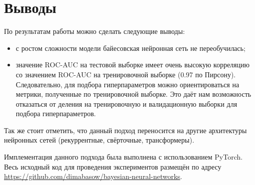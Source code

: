 \documentclass{article}
\numberwithin{equation}{section}
\begin{document}
    \section{Выводы}
    По результатам работы можно сделать следующие выводы:
    \begin{itemize}
        \item с ростом сложности модели байесовская нейронная сеть не переобучилась;
        \item значение ROC-AUC на тестовой выборке
        имеет очень высокую корреляцию со значением ROC-AUC на тренировочной выборке (0.97 по Пирсону).
        Следовательно, для подбора гиперпараметров можно ориентироваться на метрики,
        полученные по тренировочной выборке.
        Это даёт нам возможность отказаться от деления на тренировочную и валидационную выборки
        для подбора гиперпараметров.
    \end{itemize}

    Так же стоит отметить,
    что данный подход переносится на другие архитектуры нейронных сетей
    (рекуррентные, свёрточные, трансформеры).

    Имплементация данного подхода была выполнена с использованием PyTorch.
    Весь исходный код для проведения экспериментов размещён по адресу
    \url{https://github.com/dimabasow/bayesian-neural-networks}.
\end{document}
